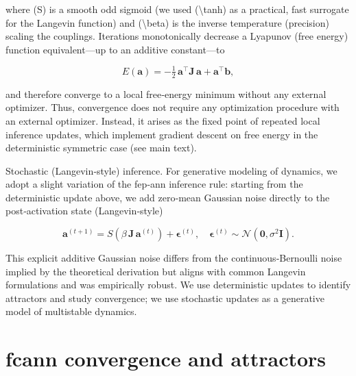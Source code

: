 \documentclass{article}
\begin{document}
where (S) is a smooth odd sigmoid (we used ({\textbackslash}tanh) as a practical, fast surrogate for the Langevin function) and ({\textbackslash}beta) is the inverse temperature (precision) scaling the couplings. Iterations monotonically decrease a Lyapunov (free energy) function equivalent---up to an additive constant---to

\begin{equation}
\label{energy-function}
E(\boldsymbol{a}) = - \tfrac{1}{2}\, \boldsymbol{a}^\top \boldsymbol{J}\, \boldsymbol{a} + \boldsymbol{a}^\top \boldsymbol{b},
\end{equation}

and therefore converge to a local free‑energy minimum without any external optimizer. Thus, convergence does not require any optimization procedure with an external optimizer. Instead, it arises as the fixed point of repeated local inference updates, which implement gradient descent on free energy in the deterministic symmetric case (see main text).

Stochastic (Langevin‑style) inference. For generative modeling of dynamics, we adopt a slight variation of the \acrshort{fep}‑\acrshort{ann} inference rule: starting from the deterministic update above, we add zero‑mean Gaussian noise directly to the post‑activation state (Langevin‑style)

\begin{equation}
\label{langevin-update}
\boldsymbol{a}^{(t+1)} = S\!\left( \beta\, \boldsymbol{J}\, \boldsymbol{a}^{(t)} \right) + \boldsymbol{\epsilon}^{(t)}, \quad \boldsymbol{\epsilon}^{(t)} \sim \mathcal{N}(\boldsymbol{0}, \sigma^2 \boldsymbol{I}).
\end{equation}

This explicit additive Gaussian noise differs from the continuous‑Bernoulli noise implied by the theoretical derivation but aligns with common Langevin formulations and was empirically robust. We use deterministic updates to identify attractors and study convergence; we use stochastic updates as a generative model of multistable dynamics.

\section{\acrshort{fcann} convergence and attractors}
\end{document}
